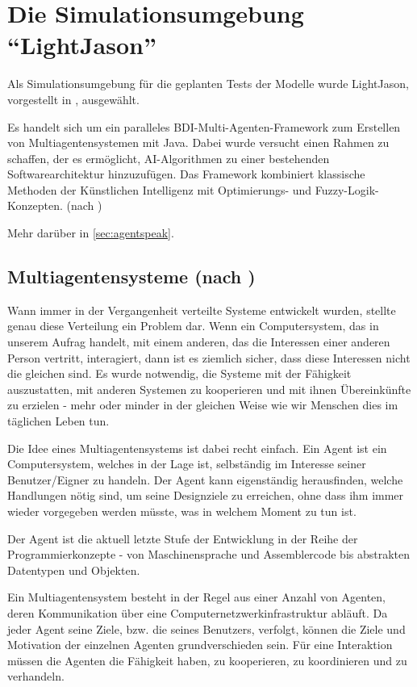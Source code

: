 \section{Die Simulationsumgebung \enquote{LightJason}}

Als Simulationsumgebung für die geplanten Tests der Modelle wurde LightJason, vorgestellt in \cite{lightjason}, ausgewählt.

Es handelt sich um ein paralleles BDI-Multi-Agenten-Framework zum Erstellen von Multiagentensystemen mit Java. 
Dabei wurde versucht einen Rahmen zu schaffen, der es ermöglicht, AI-Algorithmen zu einer bestehenden Softwarearchitektur hinzuzufügen. 
Das Framework kombiniert klassische Methoden der Künstlichen Intelligenz mit Optimierungs- und Fuzzy-Logik-Konzepten.
(nach \cite{lightjason-web})

Mehr darüber in \cref{sec:agentspeak}.

\subsection{Multiagentensysteme (nach \cite{multiagent})}

Wann immer in der Vergangenheit verteilte Systeme entwickelt wurden, stellte genau diese Verteilung ein Problem dar. 
Wenn ein Computersystem, das in unserem Aufrag handelt, mit einem anderen, das die Interessen einer anderen Person vertritt, interagiert, dann ist es ziemlich sicher, dass diese Interessen nicht die gleichen sind.
Es wurde notwendig, die Systeme mit der Fähigkeit auszustatten, mit anderen Systemen zu kooperieren und mit ihnen Übereinkünfte zu erzielen - mehr oder minder in der gleichen Weise wie wir Menschen dies im täglichen Leben tun.

Die Idee eines Multiagentensystems ist dabei recht einfach.
Ein Agent ist ein Computersystem, welches in der Lage ist, selbständig im Interesse seiner Benutzer/Eigner zu handeln.
Der Agent kann eigenständig herausfinden, welche Handlungen nötig sind, um seine Designziele zu erreichen, ohne dass ihm immer wieder vorgegeben werden müsste, was in welchem Moment zu tun ist.

Der Agent ist die aktuell letzte Stufe der Entwicklung in der Reihe der Programmierkonzepte - von Maschinensprache und Assemblercode bis abstrakten Datentypen und Objekten.

Ein Multiagentensystem besteht in der Regel aus einer Anzahl von Agenten, deren Kommunikation über eine Computernetzwerkinfrastruktur abläuft.
Da jeder Agent seine Ziele, bzw. die seines Benutzers, verfolgt, können die Ziele und Motivation der einzelnen Agenten grundverschieden sein.
Für eine Interaktion müssen die Agenten die Fähigkeit haben, zu kooperieren, zu koordinieren und zu verhandeln.

